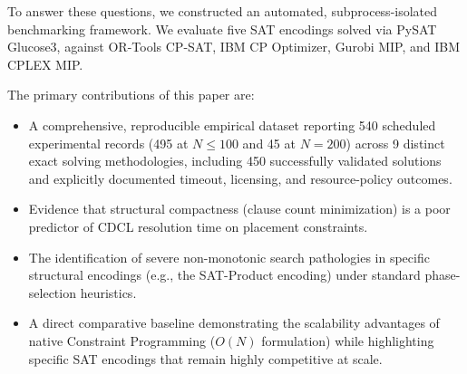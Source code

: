 To answer these questions, we constructed an automated, subprocess-isolated benchmarking framework. We evaluate five SAT encodings solved via PySAT Glucose3, against OR-Tools CP-SAT, IBM CP Optimizer, Gurobi MIP, and IBM CPLEX MIP. 

The primary contributions of this paper are:
\begin{itemize}
\item A comprehensive, reproducible empirical dataset reporting 540 scheduled experimental records (495 at $N \le 100$ and 45 at $N=200$) across 9 distinct exact solving methodologies, including 450 successfully validated solutions and explicitly documented timeout, licensing, and resource-policy outcomes.
\item Evidence that structural compactness (clause count minimization) is a poor predictor of CDCL resolution time on placement constraints.
\item The identification of severe non-monotonic search pathologies in specific structural encodings (e.g., the SAT-Product encoding) under standard phase-selection heuristics.
\item A direct comparative baseline demonstrating the scalability advantages of native Constraint Programming ($O(N)$ formulation) while highlighting specific SAT encodings that remain highly competitive at scale.
\end{itemize}
